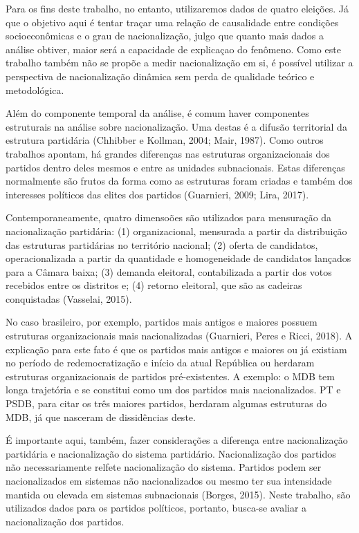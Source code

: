 \documentclass[]{article}
\begin{document}
Para os fins deste trabalho, no entanto, utilizaremos dados de quatro
eleições. Já que o objetivo aqui é tentar traçar uma relação de
causalidade entre condições socioeconômicas e o grau de nacionalização,
julgo que quanto mais dados a análise obtiver, maior será a capacidade
de explicaçao do fenômeno. Como este trabalho também não se propõe a
medir nacionalização em si, é possível utilizar a perspectiva de
nacionalização dinâmica sem perda de qualidade teórico e metodológica.

Além do componente temporal da análise, é comum haver componentes
estruturais na análise sobre nacionalização. Uma destas é a difusão
territorial da estrutura partidária (Chhibber e Kollman, 2004; Mair,
1987). Como outros trabalhos apontam, há grandes diferenças nas
estruturas organizacionais dos partidos dentro deles mesmos e entre as
unidades subnacionais. Estas diferenças normalmente são frutos da forma
como as estruturas foram criadas e também dos interesses políticos das
elites dos partidos (Guarnieri, 2009; Lira, 2017).

Contemporaneamente, quatro dimensoões são utilizados para mensuração da
nacionalização partidária: (1) organizacional, mensurada a partir da
distribuição das estruturas partidárias no território nacional; (2)
oferta de candidatos, operacionalizada a partir da quantidade e
homogeneidade de candidatos lançados para a Câmara baixa; (3) demanda
eleitoral, contabilizada a partir dos votos recebidos entre os distritos
e; (4) retorno eleitoral, que são as cadeiras conquistadas (Vasselai,
2015).

No caso brasileiro, por exemplo, partidos mais antigos e maiores possuem
estruturas organizacionais mais nacionalizadas (Guarnieri, Peres e
Ricci, 2018). A explicação para este fato é que os partidos mais antigos
e maiores ou já existiam no período de redemocratização e início da
atual República ou herdaram estruturas organizacionais de partidos
pré-existentes. A exemplo: o MDB tem longa trajetória e se constitui
como um dos partidos mais nacionalizados. PT e PSDB, para citar os três
maiores partidos, herdaram algumas estruturas do MDB, já que nasceram de
dissidências deste.

É importante aqui, também, fazer considerações a diferença entre
nacionalização partidária e nacionalização do sistema partidário.
Nacionalização dos partidos não necessariamente relfete nacionalização
do sistema. Partidos podem ser nacionalizados em sistemas não
nacionalizados ou mesmo ter sua intensidade mantida ou elevada em
sistemas subnacionais (Borges, 2015). Neste trabalho, são utilizados
dados para os partidos políticos, portanto, busca-se avaliar a
nacionalização dos partidos.
\end{document}
